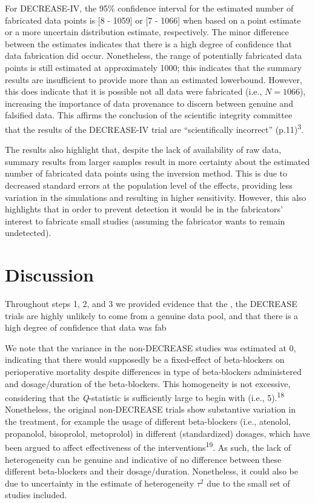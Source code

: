 \documentclass[]{article}
\begin{document}
For DECREASE-IV, the 95\% confidence interval for the estimated number
of fabricated data points is {[}8 - 1059{]} or {[}7 - 1066{]} when based
on a point estimate or a more uncertain distribution estimate,
respectively. The minor difference between the estimates indicates that
there is a high degree of confidence that data fabrication did occur.
Nonetheless, the range of potentially fabricated data points is still
estimated at approximately 1000; this indicates that the summary results
are insufficient to provide more than an estimated lowerbound. However,
this does indicate that it is possible not all data were fabricated
(i.e., \(N=1066\)), increasing the importance of data provenance to
discern between genuine and falsified data. This affirms the conclusion
of the scientific integrity committee that the results of the
DECREASE-IV trial are ``scientifically incorrect''
(p.11)\textsuperscript{3}.

The results also highlight that, despite the lack of availability of raw
data, summary results from larger samples result in more certainty about
the estimated number of fabricated data points using the inversion
method. This is due to decreased standard errors at the population level
of the effects, providing less variation in the simulations and
resulting in higher sensitivity. However, this also highlights that in
order to prevent detection it would be in the fabricators' interest to
fabricate small studies (assuming the fabricator wants to remain
undetected).

\section{Discussion}\label{discussion}

Throughout steps 1, 2, and 3 we provided evidence that the , the
DECREASE trials are highly unlikely to come from a genuine data pool,
and that there is a high degree of confidence that data was fab

We note that the variance in the non-DECREASE studies was estimated at
0, indicating that there would supposedly be a fixed-effect of
beta-blockers on perioperative mortality despite differences in type of
beta-blockers administered and dosage/duration of the beta-blockers.
This homogeneity is not excessive, considering that the
\emph{Q}-statistic is sufficiently large to begin with (i.e.,
5).\textsuperscript{18} Nonetheless, the original non-DECREASE trials
show substantive variation in the treatment, for example the usage of
different beta-blockers (i.e., atenolol, propanolol, bisoprolol,
metoprolol) in different (standardized) dosages, which have been argued
to affect effectiveness of the interventions\textsuperscript{19}. As
such, the lack of heterogeneity can be genuine and indicative of no
difference between these different beta-blockers and their
dosage/duration. Nonetheless, it could also be due to uncertainty in the
estimate of heterogeneity \(\tau^2\) due to the small set of studies
included.
\end{document}
